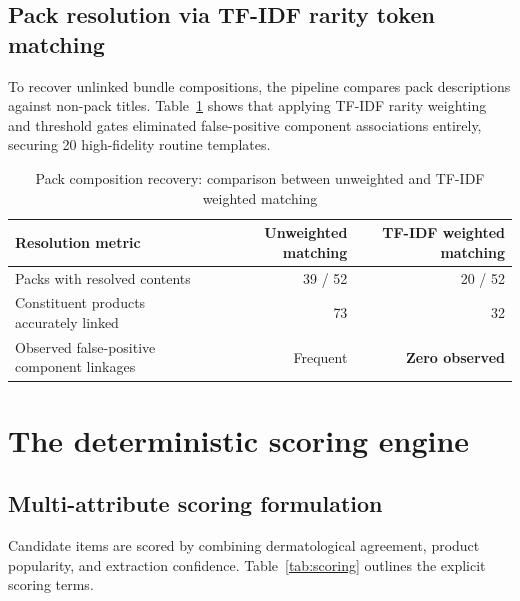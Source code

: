 \subsection{Pack resolution via TF-IDF rarity token matching}

To recover unlinked bundle compositions, the pipeline compares pack descriptions against non-pack titles. Table~\ref{tab:packs} shows that applying TF-IDF rarity weighting and threshold gates eliminated false-positive component associations entirely, securing 20 high-fidelity routine templates.

\begin{table}[H]
\caption{Pack composition recovery: comparison between unweighted and TF-IDF weighted matching}
\label{tab:packs}
\centering
\begin{tabularx}{\textwidth}{X r r}
\toprule
\textbf{Resolution metric} & \textbf{Unweighted matching} & \textbf{TF-IDF weighted matching} \\
\midrule
Packs with resolved contents & 39 / 52 & 20 / 52 \\
Constituent products accurately linked & 73 & 32 \\
Observed false-positive component linkages & Frequent & \textbf{Zero observed} \\
\bottomrule
\end{tabularx}
\end{table}

\section{The deterministic scoring engine}

\subsection{Multi-attribute scoring formulation}

Candidate items are scored by combining dermatological agreement, product popularity, and extraction confidence. Table~\ref{tab:scoring} outlines the explicit scoring terms.

